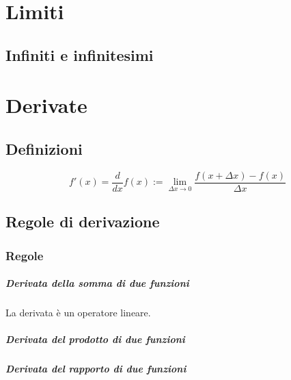 

\chapter{Limiti}

\section{Infiniti e infinitesimi}

\chapter{Derivate}

\section{Definizioni}
\begin{definition}[Derivata]
\begin{equation}
  f'(x) = \dfrac{d }{dx} f(x) := \lim_{\Delta x \rightarrow 0} \dfrac{f(x+\Delta x) - f(x)}{\Delta x}
\end{equation}
\end{definition}

\section{Regole di derivazione}
\subsection{Regole}
\paragraph{Derivata della somma di due funzioni}
\begin{property} La derivata è un operatore lineare.
\end{property}

\paragraph{Derivata del prodotto di due funzioni}
\paragraph{Derivata del rapporto di due funzioni}
